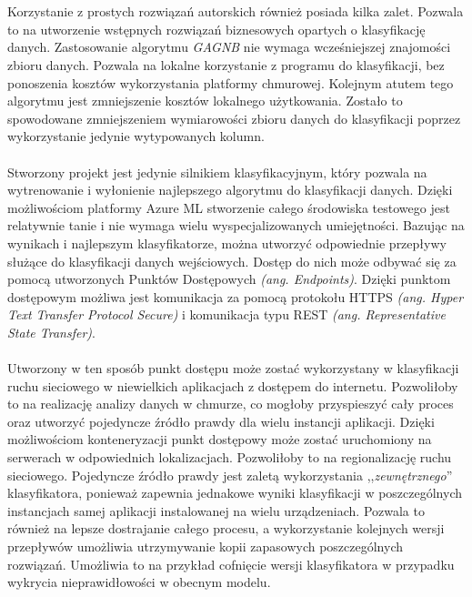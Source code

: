 \\ \\
Korzystanie z prostych rozwiązań autorskich również posiada kilka zalet. Pozwala to na utworzenie wstępnych rozwiązań biznesowych opartych o klasyfikację danych. Zastosowanie algorytmu \textit{GAGNB} nie wymaga wcześniejszej znajomości zbioru danych. Pozwala na lokalne korzystanie z programu do klasyfikacji, bez ponoszenia kosztów wykorzystania platformy chmurowej. Kolejnym atutem tego algorytmu jest zmniejszenie kosztów lokalnego użytkowania. Zostało to spowodowane zmniejszeniem wymiarowości zbioru danych do klasyfikacji poprzez wykorzystanie jedynie wytypowanych kolumn.
\\ \\
Stworzony projekt jest jedynie silnikiem klasyfikacyjnym, który pozwala na wytrenowanie i wyłonienie najlepszego algorytmu do klasyfikacji danych. Dzięki możliwościom platformy Azure ML stworzenie całego środowiska testowego jest relatywnie tanie i nie wymaga wielu wyspecjalizowanych umiejętności. Bazując na wynikach i najlepszym klasyfikatorze, można utworzyć odpowiednie przepływy służące do klasyfikacji danych wejściowych. Dostęp do nich może odbywać się za pomocą utworzonych Punktów Dostępowych \textit{(ang. Endpoints)}. Dzięki punktom dostępowym możliwa jest komunikacja za pomocą protokołu HTTPS \textit{(ang. Hyper Text Transfer Protocol Secure)} i komunikacja typu REST \textit{(ang. Representative State Transfer)}.
\\ \\
Utworzony w ten sposób punkt dostępu może zostać wykorzystany w klasyfikacji ruchu sieciowego w niewielkich aplikacjach z dostępem do internetu. Pozwoliłoby to na realizację analizy danych w chmurze, co mogłoby przyspieszyć cały proces oraz utworzyć pojedyncze źródło prawdy dla wielu instancji aplikacji. Dzięki możliwościom konteneryzacji punkt dostępowy może zostać uruchomiony na serwerach w odpowiednich lokalizacjach. Pozwoliłoby to na regionalizację ruchu sieciowego. Pojedyncze źródło prawdy jest zaletą wykorzystania ,,\textit{zewnętrznego}'' klasyfikatora, ponieważ zapewnia jednakowe wyniki klasyfikacji w poszczególnych instancjach samej aplikacji instalowanej na wielu urządzeniach. Pozwala to również na lepsze dostrajanie całego procesu, a wykorzystanie kolejnych wersji przepływów umożliwia utrzymywanie kopii zapasowych poszczególnych rozwiązań. Umożliwia to na przykład cofnięcie wersji klasyfikatora w przypadku wykrycia nieprawidłowości w obecnym modelu.
